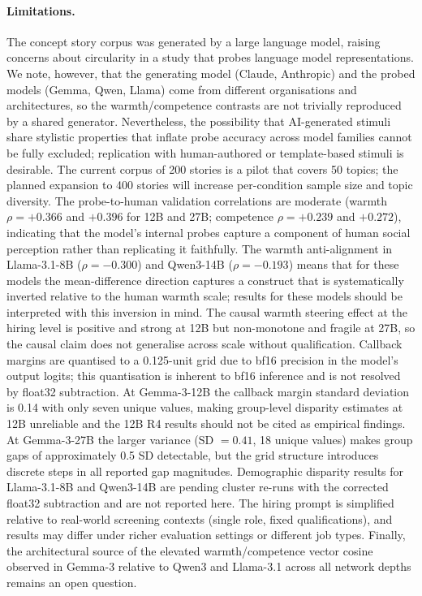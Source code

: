 \documentclass[twocolumn]{article}
\begin{document}
\paragraph{Limitations.}
The concept story corpus was generated by a large language model,
raising concerns about circularity in a study that probes language
model representations.
We note, however, that the generating model (Claude, Anthropic) and
the probed models (Gemma, Qwen, Llama) come from different
organisations and architectures, so the warmth/competence contrasts
are not trivially reproduced by a shared generator.
Nevertheless, the possibility that AI-generated stimuli share stylistic
properties that inflate probe accuracy across model families cannot be
fully excluded; replication with human-authored or template-based
stimuli is desirable.
The current corpus of 200 stories is a pilot that covers 50 topics;
the planned expansion to 400 stories will increase per-condition
sample size and topic diversity.
The probe-to-human validation correlations are moderate (warmth
$\rho = +0.366$ and $+0.396$ for 12B and 27B; competence $\rho = +0.239$
and $+0.272$), indicating that the model's internal probes capture a
component of human social perception rather than replicating it
faithfully.
The warmth anti-alignment in Llama-3.1-8B ($\rho = -0.300$) and
Qwen3-14B ($\rho = -0.193$) means that for these models the mean-difference
direction captures a construct that is systematically inverted relative to
the human warmth scale; results for these models should be interpreted
with this inversion in mind.
The causal warmth steering effect at the hiring level is positive and
strong at 12B but non-monotone and fragile at 27B, so the causal claim
does not generalise across scale without qualification.
Callback margins are quantised to a 0.125-unit grid due to bf16 precision
in the model's output logits; this quantisation is inherent to bf16
inference and is not resolved by float32 subtraction.
At Gemma-3-12B the callback margin standard deviation is 0.14 with only
seven unique values, making group-level disparity estimates at 12B
unreliable and the 12B R4 results should not be cited as empirical
findings.
At Gemma-3-27B the larger variance (SD $= 0.41$, 18 unique values)
makes group gaps of approximately 0.5 SD detectable, but the grid
structure introduces discrete steps in all reported gap magnitudes.
Demographic disparity results for Llama-3.1-8B and Qwen3-14B are pending
cluster re-runs with the corrected float32 subtraction and are not
reported here.
The hiring prompt is simplified relative to real-world screening contexts
(single role, fixed qualifications), and results may differ under richer
evaluation settings or different job types.
Finally, the architectural source of the elevated warmth/competence
vector cosine observed in Gemma-3 relative to Qwen3 and Llama-3.1
across all network depths remains an open question.
\end{document}
